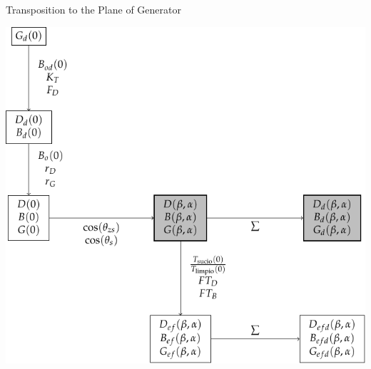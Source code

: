 \documentclass[xcolor={usenames,svgnames,dvipsnames}]{beamer}
\begin{document}
\begin{frame}[label={sec:orgc98c3f4}]{Transposition to the Plane of Generator}
\begin{center}
\includegraphics[width=.9\linewidth]{../figs/ProcedimientoCalculoRadiacionInclinada_inclinada.pdf}
\end{center}
\end{frame}
\end{document}
